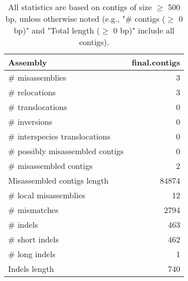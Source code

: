 \documentclass[12pt,a4paper]{article}
\begin{document}
\begin{table}[ht]
\begin{center}
\caption{All statistics are based on contigs of size $\geq$ 500 bp, unless otherwise noted (e.g., "\# contigs ($\geq$ 0 bp)" and "Total length ($\geq$ 0 bp)" include all contigs).}
\begin{tabular}{|l*{1}{|r}|}
\hline
Assembly & final.contigs \\ \hline
\# misassemblies & 3 \\ \hline
\hspace{5mm}\# relocations & 3 \\ \hline
\hspace{5mm}\# translocations & 0 \\ \hline
\hspace{5mm}\# inversions & 0 \\ \hline
\hspace{5mm}\# interspecies translocations & 0 \\ \hline
\# possibly misassembled contigs & 0 \\ \hline
\# misassembled contigs & 2 \\ \hline
Misassembled contigs length & 84874 \\ \hline
\# local misassemblies & 12 \\ \hline
\# mismatches & 2794 \\ \hline
\# indels & 463 \\ \hline
\hspace{5mm}\# short indels & 462 \\ \hline
\hspace{5mm}\# long indels & 1 \\ \hline
Indels length & 740 \\ \hline
\end{tabular}
\end{center}
\end{table}
\end{document}
